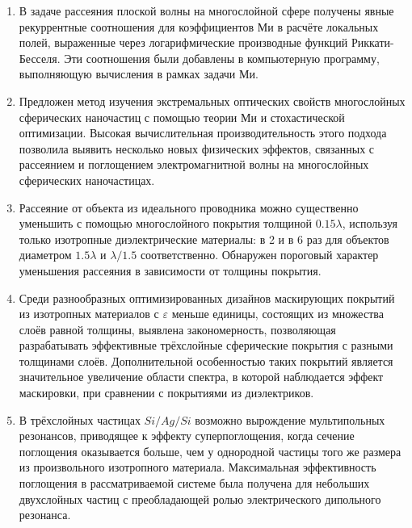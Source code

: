 \begin{enumerate}
  \item В задаче рассеяния плоской волны на многослойной сфере
    получены явные рекуррентные соотношения для коэффициентов Ми в
    расчёте локальных полей, выраженные через логарифмические
    производные функций Риккати-Бесселя.  Эти соотношения были
    добавлены в компьютерную программу, выполняющую вычисления в
    рамках задачи Ми.
  \item Предложен метод изучения экстремальных оптических свойств
    многослойных сферических наночастиц с помощью теории Ми и
    стохастической оптимизации. Высокая вычислительная
    производительность этого подхода позволила выявить несколько новых
    физических эффектов, связанных с рассеянием и поглощением
    электромагнитной волны на многослойных сферических наночастицах.
  \item Рассеяние от объекта из идеального проводника можно
    существенно уменьшить с помощью многослойного покрытия толщиной
    $0.15\lambda$, используя только изотропные диэлектрические
    материалы: в 2 и в 6 раз для объектов диаметром $1.5\lambda$ и
    $\lambda/1.5$ соответственно. Обнаружен пороговый характер
    уменьшения рассеяния в зависимости от толщины покрытия.
  \item %
    Среди разнообразных оптимизированных дизайнов маскирующих покрытий из
    изотропных материалов с $\varepsilon$ меньше единицы, состоящих из
    множества слоёв равной толщины, выявлена закономерность,
    позволяющая разрабатывать эффективные трёхслойные сферические
    покрытия с разными толщинами слоёв. Дополнительной особенностью
    таких покрытий является значительное увеличение области спектра, в
    которой наблюдается эффект маскировки, при сравнении с покрытиями
    из диэлектриков. 
  \item В трёхслойных частицах $Si/Ag/Si$ возможно вырождение
    мультипольных резонансов, приводящее к эффекту суперпоглощения,
    когда сечение поглощения оказывается больше, чем у однородной
    частицы того же размера из произвольного изотропного
    материала. Максимальная эффективность поглощения в
    рассматриваемой системе была получена для небольших двухслойных
    частиц с преобладающей ролью электрического дипольного резонанса.
\end{enumerate}
